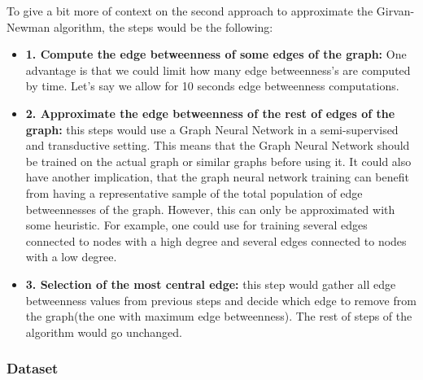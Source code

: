 To give a bit more of context on the second approach to approximate the Girvan-Newman algorithm, the steps would be the following:
\begin{itemize}
	\item \textbf{1. Compute the edge betweenness of some edges of the graph:} One advantage is that we could limit how many edge betweenness's are computed by time. Let's say we allow for 10 seconds edge betweenness computations.
	\item \textbf{2. Approximate the edge betweenness of the rest of edges of the graph:} this steps would use a Graph Neural Network in a semi-supervised and transductive setting. This means that the Graph Neural Network should be trained on the actual graph or similar graphs before using it. It could also have another implication, that the graph neural network training can benefit from having a representative sample of the total population of edge betweennesses of the graph. However, this can only be approximated with some heuristic. For example, one could use for training several edges connected to nodes with a high degree and several edges connected to nodes with a low degree.
	\item \textbf{3. Selection of the most central edge:} this step would gather all edge betweenness values from previous steps and decide which edge to remove from the graph(the one with maximum edge betweenness). The rest of steps of the algorithm would go unchanged.
\end{itemize}





\subsubsection{Dataset}


